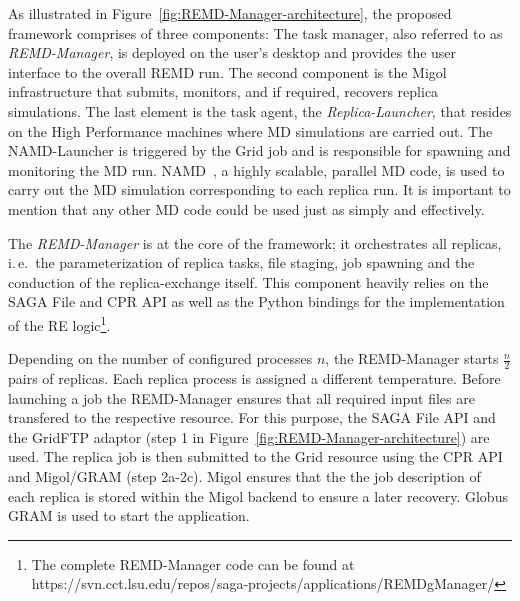 \documentclass{rspublic}
\newcommand{\alnote}[1]{ {\textcolor{blue} { ***AL: #1 }}}
\newcommand{\jhanote}[1]{ {\textcolor{red} { ***SJ: #1 }}}
\newcommand{\alnote}[1]{}
\newcommand{\jhanote}[1]{}
\begin{document}
As illustrated in Figure~\ref{fig:REMD-Manager-architecture}, the
proposed framework comprises of three components: The task manager,
also referred to as \emph{REMD-Manager}, is deployed on the user's
desktop and provides the user interface to the overall REMD run. The
second component is the Migol infrastructure that submits, monitors,
and if required, recovers replica simulations.  The last element is
the task agent, the \emph{Replica-Launcher}, that resides on the High
Performance machines where MD simulations are carried out. The
NAMD-Launcher is triggered by the Grid job and is responsible for
spawning and monitoring the MD run. NAMD~\citep{Phillips:2005gd}, a
highly scalable, parallel MD code, is used to carry out the MD
simulation corresponding to each replica run. It is important to
mention that any other MD code could be used just as simply and
effectively.

The \emph{REMD-Manager} is at the core of the framework; it
orchestrates all replicas, i.\,e.\ the parameterization of replica
tasks, file staging, job spawning and the conduction of the
replica-exchange itself. This component heavily relies on the SAGA
File and CPR API as well as the Python bindings for the implementation
of the RE logic\footnote{The complete REMD-Manager code can be found
at https://svn.cct.lsu.edu/repos/saga-projects/applications/REMDgManager/}.
                                  

Depending on the number of configured processes $n$, the REMD-Manager
starts $\frac{n}{2}$ pairs of replicas.  Each replica process is
assigned a different temperature. Before launching a job the
REMD-Manager ensures that all required input files are transfered to
the respective resource. For this purpose, the SAGA File API and the
GridFTP adaptor (step 1 in Figure~\ref{fig:REMD-Manager-architecture})
are used.  The replica job is then submitted to the Grid resource
using the CPR API and Migol/GRAM (step 2a-2c). Migol ensures that the
the job description of each replica is stored within the Migol backend
to ensure a later recovery. Globus GRAM is used to start the
application.
\end{document}
